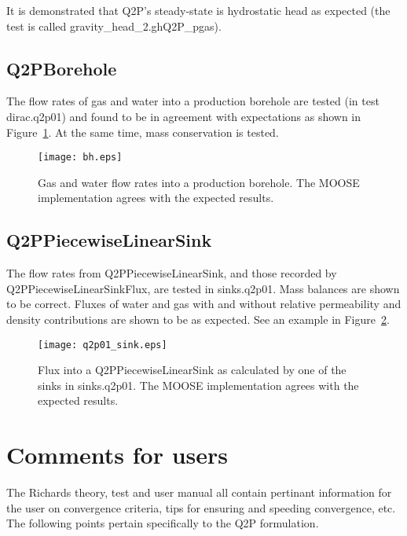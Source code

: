 \documentclass[]{scrreprt}
\begin{document}
It is demonstrated that Q2P's steady-state is hydrostatic head as
expected (the test is called gravity\_head\_2.ghQ2P\_pgas).

\section{Q2PBorehole}

The flow rates of gas and water into a production borehole are tested
(in test dirac.q2p01)
and found to be in agreement with expectations as shown in
Figure~\ref{bh.fig}.  At the same time, mass conservation is tested.

\begin{figure}[htb]
\centering
\texttt{[image: bh.eps]}
\caption{Gas and water flow rates into a production borehole.  The
  MOOSE implementation agrees with the expected results.}
\label{bh.fig}
\end{figure}

\section{Q2PPiecewiseLinearSink}

The flow rates from Q2PPiecewiseLinearSink, and those recorded by
Q2PPiecewiseLinearSinkFlux, are tested in sinks.q2p01.  Mass balances
are shown to be correct.  Fluxes of water and gas with and without
relative permeability and density contributions are shown to be as
expected.  See an example in Figure~\ref{q2p01_sink.fig}.

\begin{figure}[htb]
\centering
\texttt{[image: q2p01\_sink.eps]}
\caption{Flux into a Q2PPiecewiseLinearSink as calculated by one of
  the sinks in sinks.q2p01.  The
  MOOSE implementation agrees with the expected results.}
\label{q2p01_sink.fig}
\end{figure}





\chapter{Comments for users}

The Richards theory, test and user manual all contain pertinant
information for the user on convergence criteria, tips for ensuring
and speeding convergence, etc.  The following points pertain
specifically to the Q2P formulation.
\end{document}
